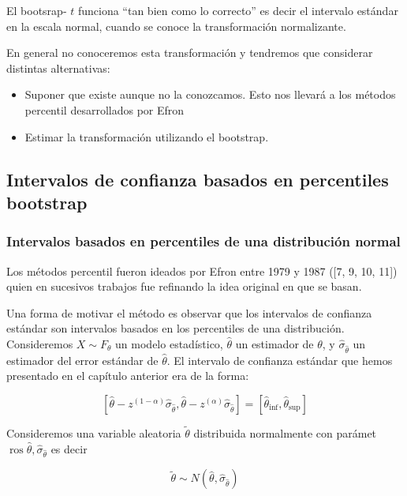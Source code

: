 \documentclass[
]{article}
\providecommand{\tightlist}{%
  \setlength{\itemsep}{0pt}\setlength{\parskip}{0pt}}
\begin{document}
El bootsrap- \(t\) funciona ``tan bien como lo correcto'' es decir el intervalo estándar en la escala normal, cuando se conoce la transformación normalizante.

En general no conoceremos esta transformación y tendremos que considerar distintas alternativas:

\begin{itemize}
\tightlist
\item
  Suponer que existe aunque no la conozcamos. Esto nos llevará a los métodos percentil desarrollados por Efron
\item
  Estimar la transformación utilizando el bootstrap.
\end{itemize}

\subsection{Intervalos de confianza basados en percentiles bootstrap}\label{intervalos-de-confianza-basados-en-percentiles-bootstrap}

\subsubsection{Intervalos basados en percentiles de una distribución normal}\label{intervalos-basados-en-percentiles-de-una-distribuciuxf3n-normal}

Los métodos percentil fueron ideados por Efron entre 1979 y 1987 ({[}7, 9, 10, 11{]}) quien en sucesivos trabajos fue refinando la idea original en que se basan.

Una forma de motivar el método es observar que los intervalos de confianza estándar son intervalos basados en los percentiles de una distribución. Consideremos \(X \sim F_{\theta}\) un modelo estadístico, \(\hat{\theta}\) un estimador de \(\theta\), y \(\hat{\sigma}_{\hat{\theta}}\) un estimador del error estándar de \(\hat{\theta}\). El intervalo de confianza estándar que hemos presentado en el capítulo anterior era de la forma:

\[
\left[\hat{\theta}-z^{(1-\alpha)} \hat{\sigma}_{\hat{\theta}}, \hat{\theta}-z^{(\alpha)} \hat{\sigma}_{\hat{\theta}}\right]=\left[\hat{\theta}_{\mathrm{inf}}, \hat{\theta}_{\mathrm{sup}}\right]
\]

Consideremos una variable aleatoria \(\tilde{\theta}\) distribuida normalmente con parámet\(\operatorname{ros} \hat{\theta}, \hat{\sigma}_{\hat{\theta}}\) es decir

\[
\tilde{\theta} \sim N\left(\hat{\theta}, \hat{\sigma}_{\hat{\theta}}\right)
\]
\end{document}
